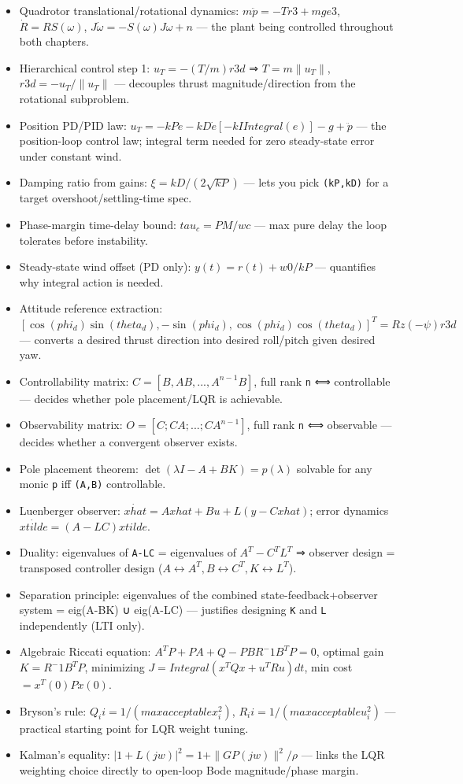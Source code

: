 \documentclass[11pt]{article}
\begin{document}
\begin{itemize}
\item Quadrotor translational/rotational dynamics: $m \ddot{p} = -T r3 + m g e3$, $\dot{R} = R S(\omega)$, $J \dot{\omega} = -S(\omega) J \omega + n$ — the plant being controlled throughout both chapters.
\item Hierarchical control step 1: $u_T = -(T/m) r3d$ ⇒ $T = m\|u_T\|$, $r3d = -u_T/\|u_T\|$ — decouples thrust magnitude/direction from the rotational subproblem.
\item Position PD/PID law: $u_T = -kP e - kD \dot{e} [- kI Integral(e)] - g + \ddot{p} $ — the position-loop control law; integral term needed for zero steady-state error under constant wind.
\item Damping ratio from gains: $\xi = kD/(2 \sqrt{kP})$ — lets you pick \texttt{(kP,kD)} for a target overshoot/settling-time spec.
\item Phase-margin time-delay bound: $tau_c = PM/wc$ — max pure delay the loop tolerates before instability.
\item Steady-state wind offset (PD only): $y (t) = r(t) + w0/kP$ — quantifies why integral action is needed.
\item Attitude reference extraction: $[\cos(phi_d)\sin(theta_d), -\sin(phi_d), \cos(phi_d)\cos(theta_d)]^T = Rz(-\psi ) r3d$ — converts a desired thrust direction into desired roll/pitch given desired yaw.
\item Controllability matrix: $C = [B, AB, ..., A^{n-1}B]$, full rank \texttt{n} ⟺ controllable — decides whether pole placement/LQR is achievable.
\item Observability matrix: $O = [C; CA; ...; CA^{n-1}]$, full rank \texttt{n} ⟺ observable — decides whether a convergent observer exists.
\item Pole placement theorem: $\det(\lambda I - A + BK) = p(\lambda)$ solvable for any monic \texttt{p} iff \texttt{(A,B)} controllable.
\item Luenberger observer: $\dot{xhat} = A xhat + B u + L(y - C xhat)$; error dynamics $\dot{xtilde} = (A-LC) xtilde$.
\item Duality: eigenvalues of \texttt{A-LC} = eigenvalues of $A^T - C^T L^T$ ⇒ observer design = transposed controller design ($A↔A^T, B↔C^T, K↔L^T$).
\item Separation principle: eigenvalues of the combined state-feedback+observer system = eig(A-BK) ∪ eig(A-LC) — justifies designing \texttt{K} and \texttt{L} independently (LTI only).
\item Algebraic Riccati equation: $A^T P + P A + Q - P B R^-1 B^T P = 0$, optimal gain $K = R^-1 B^T P$, minimizing $J = Integral(x^T Q x + u^T R u) dt$, min cost $= x^T(0) P x(0)$.
\item Bryson's rule: $Q_ii = 1/(max acceptable x_i^2)$, $R_ii = 1/(max acceptable u_i^2)$ — practical starting point for LQR weight tuning.
\item Kalman's equality: $|1+L(jw)|^2 = 1 + \|G P(jw)\|^2/\rho$ — links the LQR weighting choice directly to open-loop Bode magnitude/phase margin.
\end{itemize}
\end{document}
